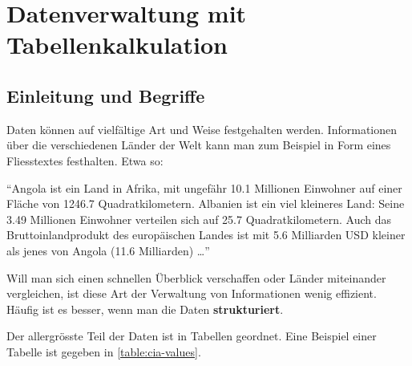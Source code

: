 \section{Datenverwaltung mit Tabellenkalkulation}
\label{subsec:tables}
\subsection{Einleitung und Begriffe}
\label{subsec:EinleitungTabellen}
Daten können auf vielfältige Art und Weise festgehalten werden. Informationen über die verschiedenen Länder der Welt kann man zum Beispiel in Form eines Fliesstextes festhalten. Etwa so:

\begin{center}
    \enquote{Angola ist ein Land in Afrika, mit ungefähr 10.1 Millionen Einwohner auf einer Fläche von 1246.7 Quadratkilometern. Albanien ist ein viel kleineres Land: Seine 3.49 Millionen Einwohner verteilen sich auf 25.7 Quadratkilometern. Auch das Bruttoinlandprodukt des europäischen Landes ist mit 5.6 Milliarden USD kleiner als jenes von Angola (11.6 Milliarden) \dots }
\end{center}

Will man sich einen schnellen Überblick verschaffen oder Länder miteinander vergleichen, ist diese Art der Verwaltung von Informationen wenig effizient. Häufig ist es besser, wenn man die Daten \textbf{strukturiert}. 

Der allergrösste Teil der Daten ist in Tabellen geordnet. Eine Beispiel einer Tabelle ist gegeben in \cref{table:cia-values}.

